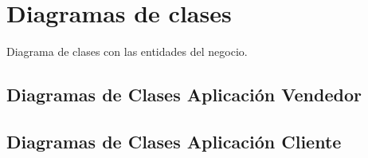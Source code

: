 \section{Diagramas de clases}

Diagrama de clases con las entidades del negocio.

\subsection{Diagramas de Clases Aplicación Vendedor}

\subsection{Diagramas de Clases Aplicación Cliente}
